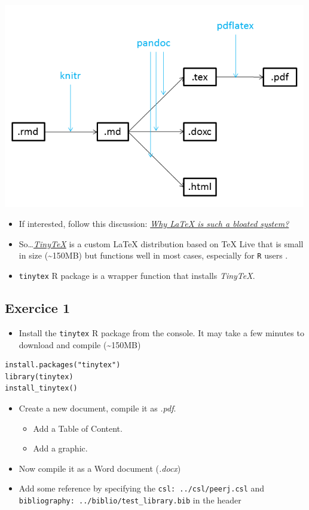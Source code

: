 \documentclass[]{article}
\providecommand{\tightlist}{%
  \setlength{\itemsep}{0pt}\setlength{\parskip}{0pt}}
\begin{document}
\includegraphics[width=5.20833in,height=\textheight]{../figures/pandoc1.png}

\begin{itemize}
\item
  If interested, follow this discussion:
  \href{https://ubuntuforums.org/showthread.php?t=395863}{\emph{Why
  LaTeX is such a bloated system?}}
\item
  So\ldots{}\href{https://yihui.name/tinytex/r/}{\emph{TinyTeX}} is a
  custom LaTeX distribution based on TeX Live that is small in size
  (\textasciitilde{}150MB) but functions well in most cases, especially
  for \texttt{R} users .
\item
  \texttt{tinytex} R package is a wrapper function that installs
  \emph{TinyTeX}.
\end{itemize}

\hypertarget{exercice-1}{%
\subsection{Exercice 1}\label{exercice-1}}

\begin{itemize}
\tightlist
\item
  Install the \texttt{tinytex} R package from the console. It may take a
  few minutes to download and compile (\textasciitilde{}150MB)
\end{itemize}

\begin{verbatim}
install.packages("tinytex")  
library(tinytex)  
install_tinytex()  
\end{verbatim}

\begin{itemize}
\item
  Create a new document, compile it as \emph{.pdf}.

  \begin{itemize}
  \tightlist
  \item
    Add a Table of Content.
  \item
    Add a graphic.
  \end{itemize}
\item
  Now compile it as a Word document (\emph{.docx})
\item
  Add some reference by specifying the \texttt{csl:\ ../csl/peerj.csl}
  and \texttt{bibliography:\ ../biblio/test\_library.bib} in the header
\end{itemize}
\end{document}
